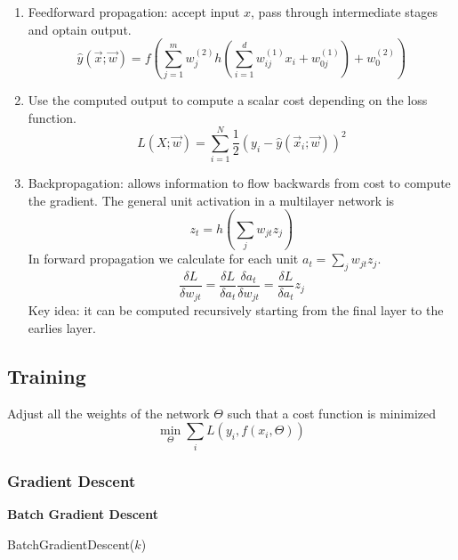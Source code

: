 \documentclass[a4paper,6pt,twocolumn,fleqn]{article}
\begin{document}
\begin{enumerate}
    \item Feedforward propagation: accept input \(x\), pass through intermediate stages and optain output.
    \begin{equation}
        \hat{y} (\vec{x}; \vec{w}) = f \left( \sum_{j=1}^m w_j^{(2)} h \left( \sum_{i=1}^d w_{ij}^{(1)} x_i + w_{0j}^{(1)} \right) + w_0^{(2)} \right)
    \end{equation}
    \item Use the computed output to compute a scalar cost depending on the loss function.
    \begin{equation}
        L(X; \vec{w}) = \sum_{i=1}^N \frac 1 2 (y_i - \hat{y}(\vec{x}_i; \vec{w}))^2
    \end{equation}
    \item Backpropagation: allows information to flow backwards from cost to compute the gradient. The general unit activation in a multilayer network is 
    \begin{equation}
        z_t = h \left( \sum_j w_{jt} z_j \right)
    \end{equation}
    In forward propagation we calculate for each unit \(a_t = \sum_j w_{jt} z_j\).
    \begin{equation}
        \frac {\delta L} {\delta w_{jt}} = \frac{\delta L} {\delta a_t} \frac {\delta a_t} {\delta w_{jt}} = \frac {\delta L} {\delta a_t} z_j
    \end{equation}
    Key idea: it can be computed recursively starting from the final layer to the earlies layer.
\end{enumerate}
\subsection{Training} %
Adjust all the weights of the network \(\Theta\) such that a cost function is minimized
\begin{equation}
    \min_\Theta \sum_i L (y_i, f(x_i, \Theta))
\end{equation}
\subsubsection{Gradient Descent} %
\textbf{Batch Gradient Descent}

\begin{algorithm}
    \caption{BatchGradientDescent($k$)}
    \label{alg:batch_gradient_descent}
\end{algorithm}
\end{document}
